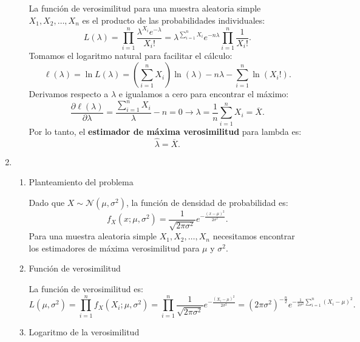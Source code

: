 \begin{enumerate}[label=\color{red}\textbf{\arabic*)}]
\begin{enumerate}[label=\arabic*)]
                La función de verosimilitud para una muestra aleatoria simple $X_1,X_2,\dots,X_n$ es el producto de las probabilidades individuales: \[
                    L(\lambda)=\prod_{i=1}^{n} \dfrac{\lambda^{X_i}e^{-\lambda} }{X_i!}=\lambda^{\sum_{i=1}^{n} X_i}e^{-n\lambda}\prod_{i=1}^{n} \dfrac{1}{X_i!}  . 
                \] 
                Tomamos el logaritmo natural para facilitar el cálculo: \[
                \ell(\lambda)=\ln L(\lambda)=\left( \sum_{i=1}^{n} X_i \right) \ln(\lambda)-n\lambda-\sum_{i=1}^{n} \ln(X_i!).
                \] 
                Derivamos respecto a $\lambda$ e igualamos a cero para encontrar el máximo: \[
                \frac{\partial \ell(\lambda)}{\partial \lambda}=\dfrac{\sum_{i=1}^{n} X_i}{\lambda}-n=0\longrightarrow \lambda=\dfrac{1}{n}\sum_{i=1}^{n} X_i=\overline{X}. 
                \] 
                Por lo tanto, el \textbf{estimador de máxima verosimilitud} para lambda es: \[
                \hat{\lambda}=\overline{X}.
                \]  
        \end{enumerate}
    \item {} 
        \begin{enumerate}[label=\arabic*)]
            \item Planteamiento del problema

                Dado que $X\sim \mathcal{N}(\mu,\sigma^2)$, la función de densidad de probabilidad es: \[
                f_X(x;\mu,\sigma^2)=\dfrac{1}{\sqrt{2\pi\sigma^2} }e^{-\frac{(x-\mu)^2}{2\sigma^2} } .
                \] 
                Para una muestra aleatoria simple $X_1,X_2,\dots,X_n$ necesitamos encontrar los estimadores de máxima verosimilitud para $\mu$ y $\sigma^2$.
            \item Función de verosimilitud

                La función de verosimilitud es: \[
                L(\mu,\sigma^2)=\prod_{i=1}^{n} f_X(X_i;\mu,\sigma^2) =\prod_{i=1}^{n} \dfrac{1}{\sqrt{2\pi\sigma^2} }e^{-\frac{(X_i-\mu)^2}{2\sigma^2} }=(2\pi\sigma^2)^{-\frac{n}{2} }e^{-\frac{1}{2\sigma^2}\sum_{i=1}^{n} (X_i-\mu)^2 }.
                \] 
            \item Logaritmo de la verosimilitud 


\end{enumerate}
\end{enumerate}
